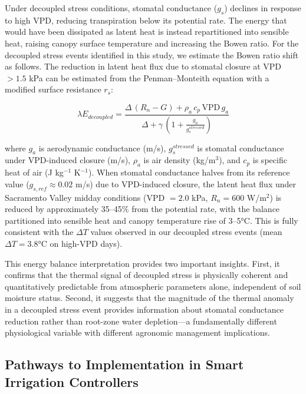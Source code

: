 \documentclass[review,12pt]{elsarticle}
\begin{document}
Under decoupled stress conditions, stomatal conductance ($g_s$) declines in response to high VPD, reducing transpiration below its potential rate. The energy that would have been dissipated as latent heat is instead repartitioned into sensible heat, raising canopy surface temperature and increasing the Bowen ratio. For the decoupled stress events identified in this study, we estimate the Bowen ratio shift as follows. The reduction in latent heat flux due to stomatal closure at VPD $> 1.5$ kPa can be estimated from the Penman--Monteith equation with a modified surface resistance $r_s$:

\begin{equation}
\lambda E_{decoupled} = \frac{\Delta\,(R_n - G) + \rho_a\,c_p\,\text{VPD}\,g_a}{\Delta + \gamma\,\left(1 + \frac{g_a}{g_s^{stressed}}\right)}
\label{eq:pm_stressed}
\end{equation}

\noindent where $g_a$ is aerodynamic conductance (m/s), $g_s^{stressed}$ is stomatal conductance under VPD-induced closure (m/s), $\rho_a$ is air density (kg/m$^3$), and $c_p$ is specific heat of air (J kg$^{-1}$ K$^{-1}$). When stomatal conductance halves from its reference value ($g_{s,ref} \approx 0.02$ m/s) due to VPD-induced closure, the latent heat flux under Sacramento Valley midday conditions (VPD $= 2.0$ kPa, $R_n = 600$ W/m$^2$) is reduced by approximately 35--45\% from the potential rate, with the balance partitioned into sensible heat and canopy temperature rise of 3--5°C. This is fully consistent with the $\Delta T$ values observed in our decoupled stress events (mean $\Delta T = 3.8$°C on high-VPD days).

This energy balance interpretation provides two important insights. First, it confirms that the thermal signal of decoupled stress is physically coherent and quantitatively predictable from atmospheric parameters alone, independent of soil moisture status. Second, it suggests that the magnitude of the thermal anomaly in a decoupled stress event provides information about stomatal conductance reduction rather than root-zone water depletion---a fundamentally different physiological variable with different agronomic management implications.

\subsection{Pathways to Implementation in Smart Irrigation Controllers}
\label{subsec:implementation}
\end{document}

